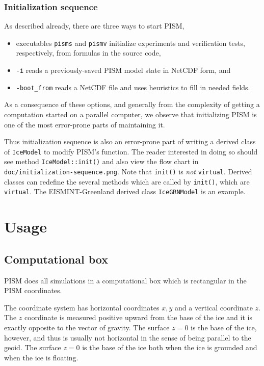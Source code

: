 \documentclass[11pt,final]{amsart}
\begin{document}
\subsubsection*{Initialization sequence}  As described already, there are three ways to start PISM,\begin{itemize}
\item executables \verb|pisms| and \verb|pismv| initialize experiments and verification tests, respectively, from formulas in the source code,
\item \verb|-i| reads a previously-saved PISM model state in NetCDF form, and
\item \verb|-boot_from| reads a NetCDF file and uses heuristics to fill in needed fields.
\end{itemize}
As a consequence of these options, and generally from the complexity of getting a computation started on a parallel computer, we observe that initializing PISM is one of the most error-prone parts of maintaining it.

Thus initialization sequence is also an error-prone part of writing a derived class of \verb|IceModel| to modify PISM's function.  The reader interested in doing so should see method \verb|IceModel::init()| and also view the flow chart in \verb|doc/initialization-sequence.png|.  Note that \verb|init()| is \emph{not} \verb|virtual|.  Derived classes can redefine the several methods which are called by \verb|init()|, which are \verb|virtual|.  The EISMINT-Greenland derived class \verb|IceGRNModel| is an example.


\clearpage
\newpage
\section{Usage}\label{sect:usage}

\subsection{Computational box} \label{subsect:coords} PISM does all simulations in a computational box which is rectangular in the PISM coordinates.

The coordinate system has horizontal coordinates $x,y$ and a vertical coordinate $z$.  The $z$ coordinate is measured positive upward from the base of the ice and it is exactly opposite to the vector of gravity.  The surface $z=0$ is the base of the ice, however, and thus is usually not horizontal in the sense of being parallel to the geoid.   The surface $z=0$ is the base of the ice both when the ice is grounded and when the ice is floating.
\end{document}
